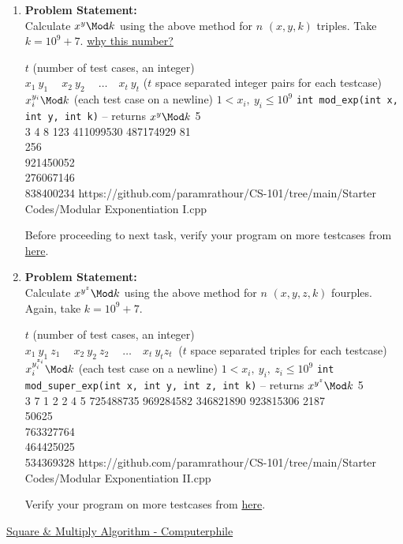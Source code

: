 \documentclass[../../Problems]{subfiles}
\begin{document}
\begin{enumerate}[label=(\alph*)]
\item 
\textbf{Problem Statement:}\\
Calculate $x^y\Mod k$ using the above method for $n$ $(x,y,k)$ triples. Take $k=10^9+7$. \href{https://www.geeksforgeeks.org/modulo-1097-1000000007/}{why this number?}
\begin{testcasesFunction}
	{$t$ \hfill(number of test cases, an integer)\\
	$x_1\ y_1\ \quad x_2\ y_2\ \quad \ldots\quad x_t\ y_t$ \hfill($t$ space separated integer pairs for each testcase)}
	{$x_i^{y_i} \Mod k$ \hfill(each test case on a newline)}
	{$1 < x_i,\ y_i \leq 10^{9}$}
	{\texttt{int mod\_exp(int x, int y, int k)} -- returns $x^y \Mod k$}
	{5\\3 4 8 123 411099530 487174929}
	{81\\256\\921450052\\276067146\\838400234}
	{https://github.com/paramrathour/CS-101/tree/main/Starter Codes/Modular Exponentiation I.cpp}
\end{testcasesFunction}
\begin{note}
	Before proceeding to next task, verify your program on more testcases from \href{https://cses.fi/problemset/task/1095}{here}.
\end{note}
\item 
\textbf{Problem Statement:}\\
Calculate $x^{y^z}\Mod k$ using the above method for $n$ $(x,y,z,k)$ fourples. Again, take $k=10^9+7$.
\begin{testcasesFunction}
	{$t$ \hfill(number of test cases, an integer)\\
	$x_1\ y_1\ z_1\ \quad x_2\ y_2\ z_2\ \quad \ldots\quad x_t\ y_t z_t\ $ \hfill($t$ space separated triples for each testcase)}
	{$x_i^{y_{i}^{z_i}} \Mod k$ \hfill(each test case on a newline)}
	{$1 < x_i,\ y_i,\ z_i \leq 10^{9}$}
	{\texttt{int mod\_super\_exp(int x, int y, int z, int k)} -- returns $x^{y^z} \Mod k$}
	{5\\3 7 1 2 2 4 5 725488735 969284582 346821890 923815306}
	{2187\\50625\\763327764\\464425025\\534369328}
	{https://github.com/paramrathour/CS-101/tree/main/Starter Codes/Modular Exponentiation II.cpp}
\end{testcasesFunction}
\begin{note}
	Verify your program on more testcases from \href{https://cses.fi/problemset/task/1712}{here}.
\end{note}
\end{enumerate}
\begin{funvideo}
\href{https://youtu.be/cbGB__V8MNk}{Square \& Multiply Algorithm - Computerphile}
\end{funvideo}
\recalctypearea
\end{document}
